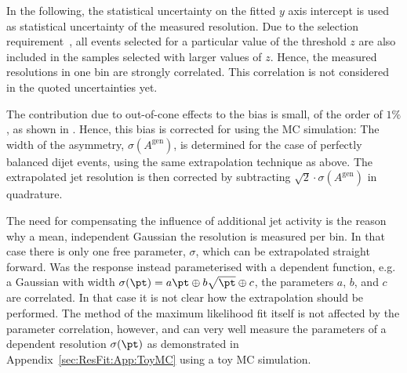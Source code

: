 In the following, the statistical uncertainty on the fitted $y$ axis
intercept is used as statistical uncertainty of the measured resolution.
Due to the selection requirement~,
all events selected for a particular value of the threshold $z$ are
also included in the samples selected with larger values of $z$.
Hence, the measured resolutions in one \ptave bin are strongly correlated.
This correlation is not considered in the quoted uncertainties yet.

The contribution due to out-of-cone effects to the bias is small, of
the order of $1\%$, as shown in
.
Hence, this bias is corrected for using the MC simulation:
The width of the \ptgen asymmetry, $\sigma(A^{\text{gen}})$, is determined for the
 case of perfectly balanced dijet events, using the
same extrapolation technique as above.
The extrapolated jet \pt resolution is then corrected by 
subtracting $\sqrt{2}\cdot\sigma(A^{\text{gen}})$ in quadrature.

The need for compensating the influence of additional jet activity is
the reason why a mean, \pt independent Gaussian the resolution is
measured per \ptave bin.
In that case there is only one free parameter, $\sigma$, which can be
extrapolated straight forward.
Was the response instead parameterised with a \pt dependent function,
e.g. a Gaussian with width \mbox{$\sigma(\pt) = a\pt \oplus
  b\sqrt{\pt} \oplus c$},
the parameters $a$, $b$, and $c$ are correlated.
In that case it is not clear how the extrapolation should be
performed.
The method of the maximum likelihood fit itself is not affected by the
parameter correlation, however, and can very well measure the
parameters of a \pt dependent resolution $\sigma(\pt)$ as demonstrated
in Appendix~\ref{sec:ResFit:App:ToyMC} using a toy MC simulation.

